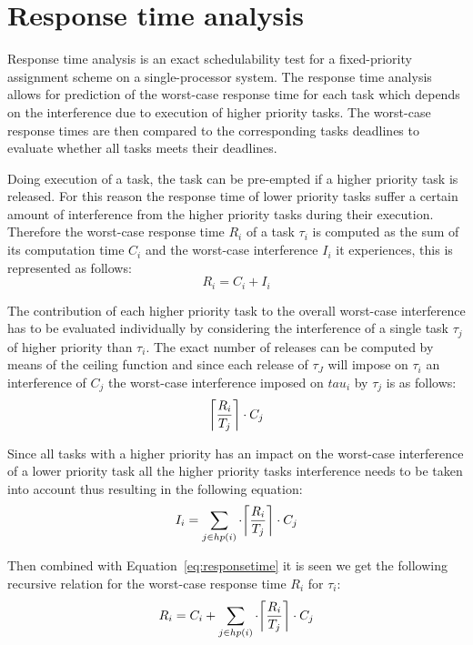 \section{Response time analysis}
Response time analysis is an exact schedulability test for a fixed-priority  assignment scheme on a single-processor system. 
The response time analysis allows for prediction of the worst-case response time for each task which depends on the interference due to execution of higher priority tasks. 
The worst-case response times are then compared to the corresponding tasks deadlines to evaluate whether all tasks meets their deadlines. 

Doing execution of a task, the task can be pre-empted if a higher priority task is released. 
For this reason the response time of lower priority tasks suffer a certain amount of interference from the higher priority tasks during their execution. 
Therefore the worst-case response time $R_i$ of a task $\tau_i$ is computed as the sum of its computation time $C_i$ and the worst-case interference $I_i$ it experiences, this is represented as follows:
\begin{equation}\label{eq:responsetime}
R_i = C_i + I_i
\end{equation}

The contribution of each higher priority task to the overall worst-case interference has to be evaluated individually by considering the interference of a single task $\tau_j$ of higher priority than $\tau_i$.
The exact number of releases can be computed by means of the ceiling function and since each release of $\tau_J$ will impose on $\tau_i$ an interference of $C_j$ the worst-case interference imposed on $tau_i$ by $\tau_j$ is as follows:
\begin{equation}
\ceil*{\frac{R_i}{T_j}} \cdot C_j
\end{equation}

Since all tasks with a higher priority has an impact on the worst-case interference of a lower priority task all the higher priority tasks interference needs to be taken into account thus resulting in the following equation:
\begin{equation}
I_i = \sum_{j\in hp(i)} \cdot \ceil*{\frac{R_i}{T_j}} \cdot C_j
\end{equation}

Then combined with Equation~\ref{eq:responsetime} it is seen we get the following recursive relation for the worst-case response time $R_i$ for $\tau_i$:
\begin{equation}
R_i = C_i + \sum_{j\in hp(i)} \cdot \ceil*{\frac{R_i}{T_j}} \cdot C_j
\end{equation}

